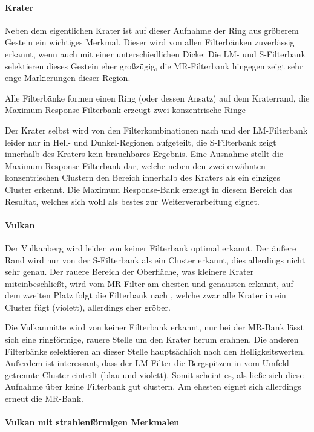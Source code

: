 \paragraph{Krater}
Neben dem eigentlichen Krater ist auf dieser Aufnahme der Ring aus gröberem Gestein ein wichtiges Merkmal. Dieser wird von allen Filterbänken zuverlässig erkannt, wenn auch mit einer unterschiedlichen Dicke: Die LM- und S-Filterbank selektieren dieses Gestein eher großzügig, die MR-Filterbank hingegen zeigt sehr enge Markierungen dieser Region.

Alle Filterbänke formen einen Ring (oder dessen Ansatz) auf dem Kraterrand, die Maximum Response-Filterbank erzeugt zwei konzentrische Ringe

Der Krater selbst wird von den Filterkombinationen nach \cite{jain_91} und der LM-Filterbank leider nur in Hell- und Dunkel-Regionen aufgeteilt, die S-Filterbank zeigt innerhalb des Kraters kein brauchbares Ergebnis. Eine Ausnahme stellt die Maximum-Response-Filterbank dar, welche neben den zwei erwähnten konzentrischen Clustern den Bereich innerhalb des Kraters als ein einziges Cluster erkennt. Die Maximum Response-Bank erzeugt in diesem Bereich das Resultat, welches sich wohl als bestes zur Weiterverarbeitung eignet.


\paragraph{Vulkan}
Der Vulkanberg wird leider von keiner Filterbank optimal erkannt. Der äußere Rand wird nur von der S-Filterbank als ein Cluster erkannt, dies allerdings nicht sehr genau. Der rauere Bereich der Oberfläche, was kleinere Krater miteinbeschließt, wird vom MR-Filter am ehesten und genausten erkannt, auf dem zweiten Platz folgt die Filterbank nach \cite{jain_91}, welche zwar alle Krater in ein Cluster fügt (violett), allerdings eher gröber.

Die Vulkanmitte wird von keiner Filterbank erkannt, nur bei der MR-Bank lässt sich eine ringförmige, rauere Stelle um den Krater herum erahnen. Die anderen Filterbänke selektieren an dieser Stelle hauptsächlich nach den Helligkeitswerten. Außerdem ist interessant, dass der LM-Filter die Bergspitzen in vom Umfeld getrennte Cluster einteilt (blau und violett). Somit scheint es, als ließe sich diese Aufnahme über keine Filterbank gut clustern. Am ehesten eignet sich allerdings erneut die MR-Bank.

\paragraph{Vulkan mit strahlenförmigen Merkmalen}

